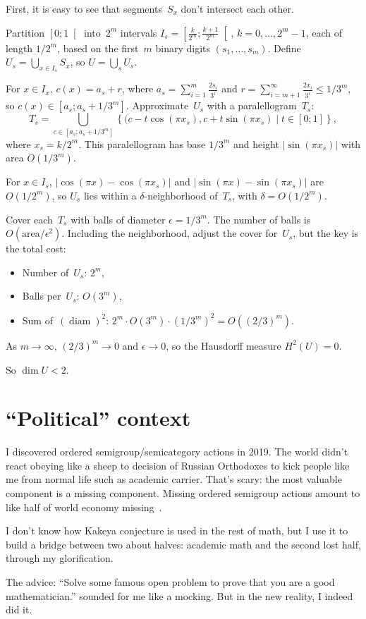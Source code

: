 \documentclass[oneside,draft]{amsart}
\newcommand{\setcond}[2]{\left\{#1\mid#2\right\}}
\newcommand{\diam}{\operatorname{diam}}
\begin{document}
First, it is easy to see that segments~$S_x$ don't intersect each other.

Partition $\left[0;1\right[$ into~$2^m$ intervals $I_s=\left[\frac{k}{2^m};\frac{k+1}{2^m}\right[$, $k=0,\ldots,2^m-1$, each of length $1/2^m$, based on the first~$m$ binary digits $(s_1,\ldots,s_m)$. Define $U_s=\bigcup_{x\in I_s} S_x$, so $U=\bigcup_s U_s$.

For $x\in I_x$, $c(x)=a_s+r$, where $a_s=\sum_{i=1}^m \frac{2s_i}{3^i}$ and $r=\sum_{i=m+1}^\infty \frac{2x_i}{3^i}\leq 1/3^m$, so $c(x)\in[a_s;a_s+1/3^m]$. Approximate~$U_s$ with a paralellogram~$T_s$:
\[
T_s = \bigcup_{c\in[a_s;a_s+1/3^m]} \setcond{(c-t\cos(\pi x_s), c+t\sin(\pi x_s)}{t\in[0;1]},
\]
where $x_s=k/2^m$. This paralellogram has base $1/3^m$ and height $\lvert\sin(\pi x_s)\rvert$ with area $O(1/3^m)$.

For $x\in I_s$, $\lvert\cos(\pi x)-\cos(\pi x_s)\rvert$ and $\lvert\sin(\pi x)-\sin(\pi x_s)\rvert$ are $O(1/2^m)$, so $U_s$ lies within a $\delta$-neigh\-bor\-hood of~$T_s$, with $\delta=O(1/2^m)$.

Cover each~$T_s$ with balls of diameter $\epsilon=1/3^m$. The number of balls is $O(\mathrm{area}/\epsilon^2)$. Including the neighborhood, adjust the cover for~$U_s$, but the key is the total cost:

\begin{itemize}
\item Number of~$U_s$: $2^m$,
\item Balls per~$U_s$: $O(3^m)$,
\item Sum of~$(\diam)^2$: $2^m\cdot O(3^m)\cdot(1/3^m)^2=O((2/3)^m)$.
\end{itemize}

As $m\to\infty$, $(2/3)^m\to 0$ and $\epsilon\to 0$, so the Hausdorff measure $H^2(U)=0$.

So $\dim U<2$.

\section{``Political'' context}

I discovered ordered semigroup/semicategory actions in 2019. The world didn't react obeying like a sheep to decision of Russian Orthodoxes to kick people like me from normal life such as academic carrier. That's scary: the most valuable component is a missing component. Missing ordered semigroup actions amount to like half of world economy missing~\cite{osa-important}.

I don't know how Kakeya conjecture is used in the rest of math, but I use it to build a bridge between two about halves: academic math and the second lost half, through my glorification.

The advice: ``Solve some famous open problem to prove that you are a good mathematician.'' sounded for me like a mocking. But in the new reality, I indeed did it.



\end{document}
